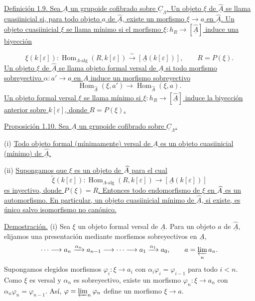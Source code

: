 \underline{Definición 1.9. Sea $\underline A$ un grupoide cofibrado
sobre $\underline C_\Lambda$. Un objeto $\xi$ de
$\widehat{\underline A}$ se llama cuasiinicial si, para todo objeto
$a$ de $\widehat{\underline A}$, existe un morfismo $\xi\to a$ en
$\widehat{\underline A}$. Un objeto cuasiinicial $\xi$ se llama
mínimo si el morfismo
$\xi:h_R\longrightarrow[\widehat{\underline A}]$ induce una biyección}


\[
 \xi(k[\varepsilon]):
 \operatorname{Hom}_{\Lambda\text{-alg}}(R,k[\varepsilon])
 \xrightarrow{\ \sim\ }
 [\underline A(k[\varepsilon])],
 \qquad R=P(\xi).
\]
\underline{Un objeto $\xi$ de $\widehat{\underline A}$ se llama
objeto formal versal de $\underline A$ si todo morfismo sobreyectivo
$\alpha:a'\to a$ en $\underline A$ induce un morfismo sobreyectivo}
\[
 \operatorname{Hom}_{\widehat{\underline A}}(\xi,a')
 \longrightarrow
 \operatorname{Hom}_{\widehat{\underline A}}(\xi,a).
\]
\underline{Un objeto formal versal $\xi$ se llama mínimo si
$\xi:h_R\longrightarrow[\widehat{\underline A}]$ induce la biyección
anterior sobre $k[\varepsilon]$, donde $R=P(\xi)$.}

\underline{Proposición 1.10. Sea $\underline A$ un grupoide cofibrado
sobre $\underline C_\Lambda$.}

(i) \underline{Todo objeto formal (mínimamente) versal de
$\underline A$ es un objeto cuasiinicial (mínimo) de
$\widehat{\underline A}$.}

(ii) \underline{Supongamos que $\xi$ es un objeto de
$\sisi{\widehat A}{\widehat{\underline A}}$ para el cual}
\[
 \widetilde\xi(k[\varepsilon]):
 \operatorname{Hom}_{\Lambda\text{-alg}}(R,k[\varepsilon])
 \longrightarrow[\underline A(k[\varepsilon])]
\]
\underline{es inyectivo, donde $P(\xi)=R$. Entonces todo endomorfismo
de $\xi$ en $\sisi{\widehat A}{\widehat{\underline A}}$ es un automorfismo. En
particular, un objeto cuasiinicial mínimo de $\widehat{\underline A}$,
si existe, es único salvo isomorfismo no canónico.}

\underline{Demostración.} (i) Sea $\xi$ un objeto formal versal de
$\underline A$. Para un objeto $a$ de $\widehat{\underline A}$,
elijamos una presentación mediante morfismos sobreyectivos en
$\underline A$,
\[
 \cdots\longrightarrow a_n\xrightarrow{\alpha_n}a_{n-1}
 \longrightarrow\cdots\longrightarrow
 a_1\xrightarrow{\alpha_1}a_0,
 \qquad a=\varprojlim_n a_n.
\]
Supongamos elegidos morfismos $\varphi_i:\xi\longrightarrow a_i$ con
$\alpha_i\varphi_i=\varphi_{i-1}$ para todo $i<n$. Como $\xi$ es
versal y $\alpha_n$ es sobreyectivo, existe un morfismo
$\varphi_n:\xi\longrightarrow a_n$ con
$\alpha_n\varphi_n=\varphi_{n-1}$. Así,
$\varphi=\varprojlim_n\varphi_n$ define un morfismo
$\xi\longrightarrow a$.

